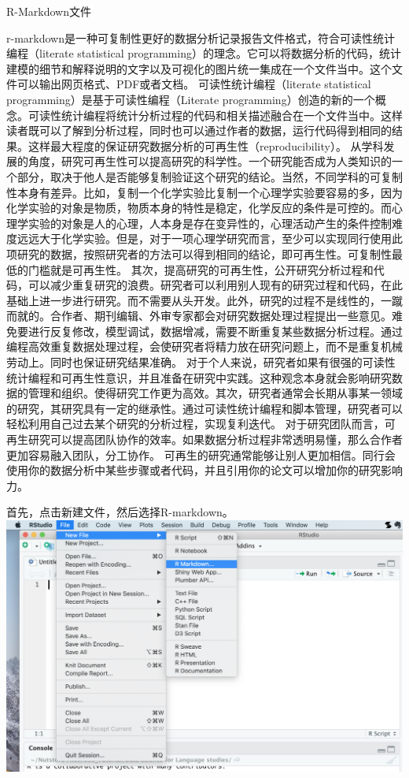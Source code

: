 \documentclass[]{book}
\begin{document}
R-Markdown文件

r-markdown是一种可复制性更好的数据分析记录报告文件格式，符合可读性统计编程（literate statistical programming）的理念。它可以将数据分析的代码，统计建模的细节和解释说明的文字以及可视化的图片统一集成在一个文件当中。这个文件可以输出网页格式、PDF或者文档。
可读性统计编程（literate statistical programming）是基于可读性编程（Literate programming）创造的新的一个概念。可读性统计编程将统计分析过程的代码和相关描述融合在一个文件当中。这样读者既可以了解到分析过程，同时也可以通过作者的数据，运行代码得到相同的结果。这样最大程度的保证研究数据分析的可再生性（reproducibility）。
从学科发展的角度，研究可再生性可以提高研究的科学性。一个研究能否成为人类知识的一个部分，取决于他人是否能够复制验证这个研究的结论。当然，不同学科的可复制性本身有差异。比如，复制一个化学实验比复制一个心理学实验要容易的多，因为化学实验的对象是物质，物质本身的特性是稳定，化学反应的条件是可控的。而心理学实验的对象是人的心理，人本身是存在变异性的，心理活动产生的条件控制难度远远大于化学实验。但是，对于一项心理学研究而言，至少可以实现同行使用此项研究的数据，按照研究者的方法可以得到相同的结论，即可再生性。可复制性最低的门槛就是可再生性。
其次，提高研究的可再生性，公开研究分析过程和代码，可以减少重复研究的浪费。研究者可以利用别人现有的研究过程和代码，在此基础上进一步进行研究。而不需要从头开发。此外，研究的过程不是线性的，一蹴而就的。合作者、期刊编辑、外审专家都会对研究数据处理过程提出一些意见。难免要进行反复修改，模型调试，数据增减，需要不断重复某些数据分析过程。通过编程高效重复数据处理过程，会使研究者将精力放在研究问题上，而不是重复机械劳动上。同时也保证研究结果准确。
对于个人来说，研究者如果有很强的可读性统计编程和可再生性意识，并且准备在研究中实践。这种观念本身就会影响研究数据的管理和组织。使得研究工作更为高效。其次，研究者通常会长期从事某一领域的研究，其研究具有一定的继承性。通过可读性统计编程和脚本管理，研究者可以轻松利用自己过去某个研究的分析过程，实现复利迭代。
对于研究团队而言，可再生研究可以提高团队协作的效率。如果数据分析过程非常透明易懂，那么合作者更加容易融入团队，分工协作。
可再生的研究通常能够让别人更加相信。同行会使用你的数据分析中某些步骤或者代码，并且引用你的论文可以增加你的研究影响力。

首先，点击新建文件，然后选择R-markdown。
\includegraphics{images/2.4.png}
\end{document}
